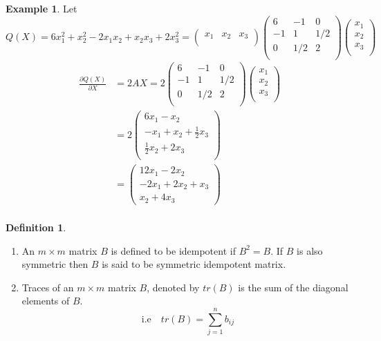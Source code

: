 \documentclass[11pt,a4paper]{article}
\theoremstyle{definition}
\newtheorem{defn}[thm]{Definition}
\newtheorem{exa}[thm]{Example}
\begin{document}
\begin{exa}
Let $Q(X)=6x_1^2+x^2_2-2x_1x_2+x_2x_3+2x^2_3=
\begin{pmatrix}
x_1 & x_2 & x_3\\
\end{pmatrix}
\begin{pmatrix}
6 & -1 & 0\\
-1 & 1 & 1/2\\
0 & 1/2 & 2\\
\end{pmatrix}
\begin{pmatrix}
x_1\\x_2\\x_3\\
\end{pmatrix}
$\\


\begin{align*}
\frac{\partial Q(X)}{\partial X} & = 2AX=2
\begin{pmatrix}
6 & -1 & 0\\
-1 & 1 & 1/2\\
0 & 1/2 & 2\\
\end{pmatrix}
\begin{pmatrix}
x_1\\x_2\\x_3\\
\end{pmatrix}\\
& =2
\begin{pmatrix}
6x_1-x_2\\ 
-x_1+x_2+\frac{1}{2}x_3\\
\frac{1}{2}x_2 +2x_3\\
\end{pmatrix}\\
& =
\begin{pmatrix}
12x_1-2x_2\\
-2x_1+2x_2+x_3\\
x_2+4x_3
\end{pmatrix}\\
\end{align*}
\end{exa}


\begin{defn}\label{res:defn:1.3.3}
\begin{enumerate}
\item[i.] An $m\times m$ matrix $B$ is defined to be idempotent if $B^2=B$. If $B$ is also symmetric then $B$ is said to be symmetric idempotent matrix.
\item[ii.] Traces of an $m\times m$ matrix $B$, denoted by $tr(B)$ is the sum of the diagonal elements of $B$.$$\text{i.e}\quad  tr(B)=\sum^n_{j=1}b_{ij}$$\\
\end{enumerate}
\end{defn}
\end{document}
